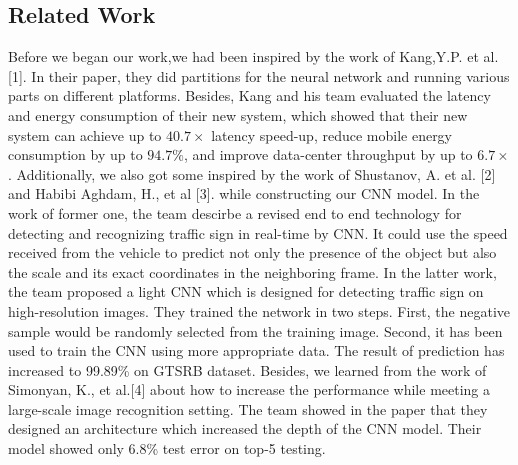 \documentclass[conference]{IEEEtran}
\begin{document}
\subsection{Related Work}

Before we began our work,we had been inspired by the work of Kang,Y.P. et al. [1]. In their paper, they did partitions for the neural network and running various parts on different platforms. Besides, Kang and his team evaluated the latency and energy consumption of their new system, which showed that their new system can achieve up to $40.7 \times$ latency speed-up, reduce mobile energy consumption by up to $94.7 \%$, and improve data-center throughput by up to $6.7 \times$. Additionally, we also got some inspired by the work of Shustanov, A. et al. [2] and Habibi Aghdam, H., et al [3]. while constructing our CNN model. In the work of former one, the team descirbe a revised end to end technology for detecting and recognizing traffic sign in real-time by CNN. It could use the speed received from the vehicle to predict not only the presence of the object but also the scale and its exact coordinates in the neighboring frame. In the latter work, the team proposed a light CNN which is designed for detecting traffic sign on high-resolution images. They trained the network in two steps. First, the negative sample would be randomly selected from the training image. Second, it has been used to train the CNN using more appropriate data. The result of prediction has increased to 99.89\% on GTSRB dataset. Besides, we learned from the work of Simonyan, K., et al.[4] about how to increase the performance while meeting a large-scale image recognition setting. The team showed in the paper that they designed an architecture which increased the depth of the CNN model. Their model showed only 6.8\% test error on top-5 testing.   
\end{document}
